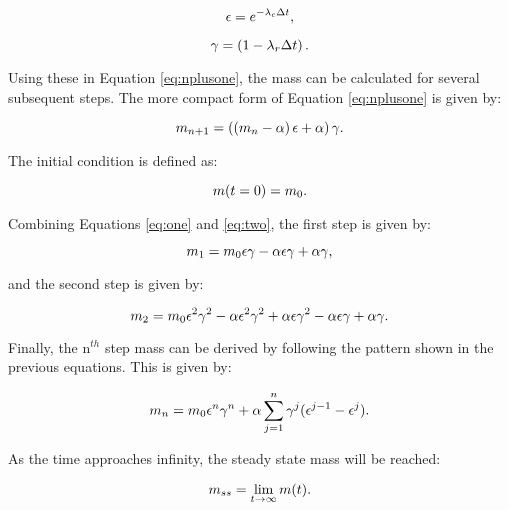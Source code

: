 \begin{equation} \hfill
\epsilon = e^{-\lambda_c \Delta t},
\hfill \end{equation}

\begin{equation} \hfill
\gamma = \left(1 - {\lambda_r \Delta t} \right).
\hfill \end{equation}

Using these in Equation \eqref{eq:nplusone}, the mass can be calculated for several subsequent steps.
The more compact form of Equation \eqref{eq:nplusone} is given by:

\begin{equation} \hfill
m_{n+1} = \left(\left(m_n - \alpha \right) \epsilon  + \alpha\right) \gamma.
\hfill \label{eq:one} \end{equation}

The initial condition is defined as:

\begin{equation} \hfill
m(t=0) = m_0.
\hfill \label{eq:two} \end{equation}

Combining Equations \eqref{eq:one} and \eqref{eq:two}, the first step is given by:

\begin{equation} \hfill
m_1 = m_0 \epsilon \gamma - \alpha \epsilon \gamma + \alpha \gamma,
\hfill \end{equation}

and the second step is given by:

\begin{equation} \hfill
m_2 = m_0 \epsilon^2 \gamma^2 - \alpha \epsilon^2 \gamma^2 + \alpha \epsilon \gamma^2 - \alpha \epsilon \gamma + \alpha \gamma.
\hfill \end{equation}

Finally, the n$^{th}$ step mass can be derived by following the pattern shown in the previous equations.
This is given by:

\begin{equation} \hfill
m_n = m_0 \epsilon^n \gamma^n + \alpha \sum_{j=1}^n \gamma^j (\epsilon^{j-1} - \epsilon^j).
\hfill \end{equation}

As the time approaches infinity, the steady state mass will be reached:

\begin{equation} \hfill
m_{ss} = \lim_{t \rightarrow \infty} m(t).
\hfill \end{equation}

